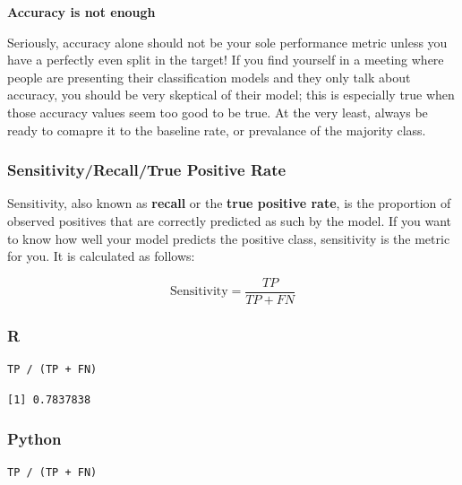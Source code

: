 \documentclass[
  letterpaper,
]{krantz}
\begin{document}
\begin{tcolorbox}[enhanced jigsaw, bottomrule=.15mm, rightrule=.15mm, colframe=quarto-callout-warning-color-frame, colback=white, breakable, arc=.35mm, left=2mm, opacityback=0, leftrule=.75mm, toprule=.15mm]

\vspace{-3mm}\textbf{Accuracy is not enough}\vspace{3mm}

Seriously, accuracy alone should not be your sole performance metric
unless you have a perfectly even split in the target! If you find
yourself in a meeting where people are presenting their classification
models and they only talk about accuracy, you should be very skeptical
of their model; this is especially true when those accuracy values seem
too good to be true. At the very least, always be ready to comapre it to
the baseline rate, or prevalance of the majority class.

\end{tcolorbox}

\subsubsection{Sensitivity/Recall/True Positive
Rate}\label{sec-knowing-metrics-sensitivity}

Sensitivity, also known as \textbf{recall} or the \textbf{true positive
rate}, is the proportion of observed positives that are correctly
predicted as such by the model. If you want to know how well your model
predicts the positive class, sensitivity is the metric for you. It is
calculated as follows:

\[\text{Sensitivity} = \frac{TP}{TP + FN}\]

\subsubsection{R}

\begin{verbatim}
TP / (TP + FN)
\end{verbatim}

\begin{verbatim}
[1] 0.7837838
\end{verbatim}

\subsubsection{Python}

\begin{verbatim}
TP / (TP + FN)
\end{verbatim}
\end{document}
